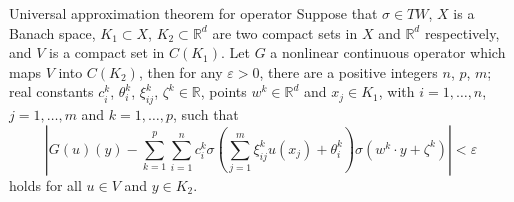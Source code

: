 \documentclass{beamer}
\newcommand{\numberset}{\mathbb}
\newcommand{\R}{\numberset{R}}
\begin{document}
\begin{frame}[noframenumbering]{Universal approximation theorem for operator}
	Suppose that $ \sigma \in TW $, $ X $ is a Banach space, $ K_1 \subset X $, $ K_2 \subset \R^d $ are two compact sets in $ X $ and $ \R^{d} $ respectively, and $ V $ is a compact set in $ C(K_1) $. Let $ G $ a nonlinear continuous operator which maps $ V $ into $ C(K_2) $, then for any $ \varepsilon > 0 $, there are a positive integers $ n $, $ p $, $ m $; real constants $ c_i^{k}$, $ \theta_i^{k}$, $ \xi_{ij}^{k} $, $ \zeta^k \in \R $, points $ w^{k} \in \R^d $ and $ x_j \in K_1 $, with $ i = 1, \dots, n$, $ j = 1, \dots, m $ and $ k = 1, \dots, p $, such that
	\[ \left| G(u)(y) - \sum_{k=1}^{p}\sum_{i=1}^{n}c_i^k \sigma \left( \sum_{j=1}^{m} \xi_{ij}^k u(x_j) + \theta_i^k \right) \sigma(w^k \cdot y + \zeta^k) \right| < \varepsilon  \]
	holds for all $ u \in V $ and $ y \in K_2 $.
\end{frame}
\end{document}
